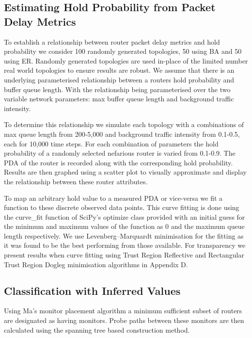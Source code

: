   \subsection{Estimating Hold Probability from Packet Delay Metrics}
  \label{ssec:pdatoholdprob}
  To establish a relationship between router packet delay metrics and hold probability we  consider 100 randomly generated topologies, 50 using BA and 50 using ER. Randomly generated topologies are used in-place of the limited number real world topologies to ensure results are robust. We assume that there is an underlying parameterised relationship between a routers hold probability and buffer queue length. With the relationship being parameterised over the two variable network parameters: max buffer queue length and background traffic intensity.\par
  To determine this relationship we simulate each topology with a combinations of max queue length from  200-5,000 and background traffic intensity from 0.1-0.5, each for 10,000 time steps. For each combination of parameters the hold probability of a randomly selected nefarious router is varied from 0.1-0.9. The PDA of the router is recorded along with the corresponding hold probability. Results are then graphed using a scatter plot to visually approximate and display the relationship between these router attributes.\par
  To map an arbitrary hold value to a measured PDA or vice-versa we fit a function to these discrete observed data points. This curve fitting is done using the curve\_fit function of SciPy's optimize class provided with an initial guess for the minimum and maximum values of the function as 0 and the maximum queue length respectively. We use Levenberg–Marquardt minimisation for the fitting as it was found to be the best performing from those available. For transparency we present results when curve fitting using Trust Region Reflective and Rectangular Trust Region Dogleg minimisation algorithms in Appendix D.\par

  \subsection{Classification with Inferred Values}
  \label{ssec:MInferredvalues}
  
  Using Ma's monitor placement algorithm a minimum sufficient subset of routers are designated as having monitors. Probe paths between these monitors are then calculated using the spanning tree based construction method.

